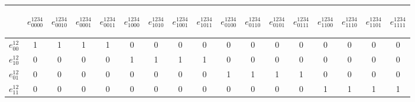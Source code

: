 \documentclass[10pt]{article}
\begin{document}
\FloatBarrier
\pagebreak
\makeatletter{}\begin{table}[!ht]
\centering
\begin{tabular}{ r || c | c | c | c | c | c | c | c | c | c | c | c | c | c | c | c }
		 &	\begin{sideways}$e^{1234}_{0000}$\end{sideways} & \begin{sideways}$e^{1234}_{0010}$\end{sideways} & \begin{sideways}$e^{1234}_{0001}$\end{sideways} & \begin{sideways}$e^{1234}_{0011}$\end{sideways}
			  & \begin{sideways}$e^{1234}_{1000}$\end{sideways} & \begin{sideways}$e^{1234}_{1010}$\end{sideways} & \begin{sideways}$e^{1234}_{1001}$\end{sideways} & \begin{sideways}$e^{1234}_{1011}$\end{sideways}
			  &	\begin{sideways}$e^{1234}_{0100}$\end{sideways} & \begin{sideways}$e^{1234}_{0110}$\end{sideways} & \begin{sideways}$e^{1234}_{0101}$\end{sideways} & \begin{sideways}$e^{1234}_{0111}$\end{sideways}
			  &	\begin{sideways}$e^{1234}_{1100}$\end{sideways} & \begin{sideways}$e^{1234}_{1110}$\end{sideways} & \begin{sideways}$e^{1234}_{1101}$\end{sideways} & \begin{sideways}$e^{1234}_{1111}$\end{sideways}\\ \hline \hline
    $e^{12}_{00}$ & 1 & 1 & 1 & 1 & 0 & 0 & 0 & 0 & 0 & 0 & 0 & 0 & 0 & 0 & 0 & 0\\ \hline
    $e^{12}_{10}$ & 0 & 0 & 0 & 0 & 1 & 1 & 1 & 1 & 0 & 0 & 0 & 0 & 0 & 0 & 0 & 0\\ \hline
    $e^{12}_{01}$ & 0 & 0 & 0 & 0 & 0 & 0 & 0 & 0 & 1 & 1 & 1 & 1 &  0 & 0 & 0 & 0\\ \hline
    $e^{12}_{11}$ & 0 & 0 & 0 & 0 & 0 & 0 & 0 & 0 & 0 & 0 & 0 & 0 & 1 & 1 & 1 & 1\\ \hline


\end{tabular}
\end{table}
\end{document}
